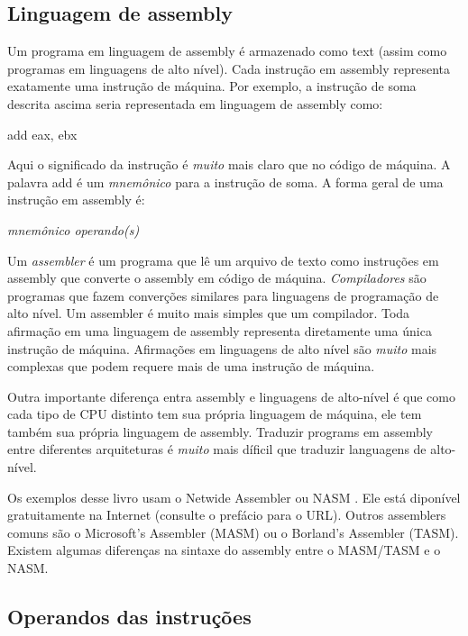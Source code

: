 \subsection{Linguagem de assembly}

Um programa em linguagem de assembly é armazenado como text (assim como
programas em linguagens de alto nível). Cada instrução em assembly representa
exatamente uma instrução de máquina. Por exemplo, a instrução de soma descrita
ascima  seria representada em linguagem de assembly como:
\begin{CodeQuote}
   add eax, ebx
\end{CodeQuote}
Aqui o significado da instrução é \emph{muito} mais claro que no código de
máquina. A palavra {\code add} é um \emph{mnemônico}  para a
instrução de soma. A forma geral de uma instrução em assembly é:
\begin{CodeQuote}
  {\em mnemônico operando(s)}
\end{CodeQuote}

Um \emph{assembler}  é um programa que lê um arquivo de texto
como instruções em assembly que converte o assembly em código de máquina.
\emph{Compiladores}  são programas que fazem converções
similares para linguagens de programação de alto nível. Um assembler é muito
mais simples que um compilador.  Toda afirmação em uma
linguagem de assembly representa diretamente uma única instrução de máquina.
Afirmações em linguagens de alto nível são \emph{muito} mais complexas que
podem requere mais de uma instrução de máquina.

Outra importante diferença entra assembly e linguagens de alto-nível é que como
cada tipo de CPU distinto tem sua própria linguagem de máquina, ele tem também
sua própria linguagem de assembly. Traduzir programs em assembly entre
diferentes arquiteturas é \emph{muito} mais díficil que traduzir languagens de
alto-nível.

Os exemplos desse livro usam o Netwide Assembler ou NASM . Ele está
diponível gratuitamente na Internet (consulte o prefácio para o URL). Outros
assemblers comuns são o Microsoft's Assembler (MASM)  ou o
Borland's Assembler (TASM).  Existem algumas diferenças na sintaxe
do assembly entre o MASM/TASM e o NASM.

\subsection{Operandos das instruções}

